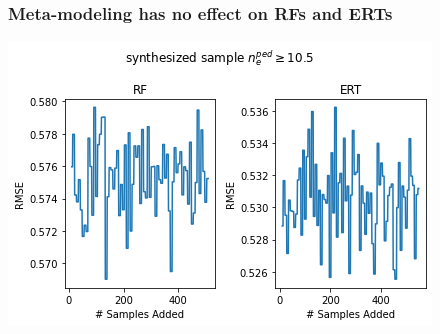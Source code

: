 \documentclass{beamer}
\begin{document}
\begin{frame}
\frametitle{Meta-modeling has no effect on RFs and ERTs}

\includegraphics[scale=0.53]{./src/ERT_vs_RF_meta_modeling}
\end{frame}
\end{document}
